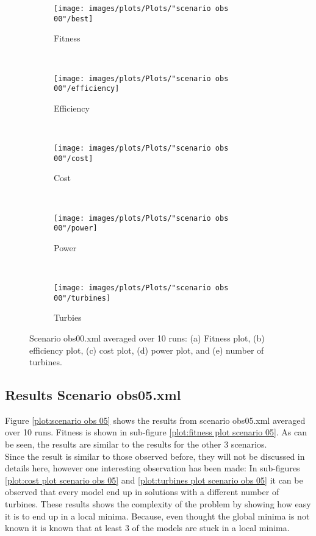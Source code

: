 \begin{figure}[h!]
    \centering
      \begin{subfigure}[b]{0.31\textwidth}
        \texttt{[image: images/plots/Plots/"scenario obs 00"/best]}
        \caption{Fitness}
        \hfill
        \label{plot:fitness plot scenario obs 00}
    \end{subfigure}
    ~
      \begin{subfigure}[b]{0.31\textwidth}
        \texttt{[image: images/plots/Plots/"scenario obs 00"/efficiency]}
        \caption{Efficiency}
        \hfill
        \label{plot:efficiency plot scenario obs 00}
    \end{subfigure}
    ~
    \begin{subfigure}[b]{0.31\textwidth}
        \texttt{[image: images/plots/Plots/"scenario obs 00"/cost]}
        \caption{Cost}
        \hfill
        \label{plot:cost plot scenario obs 00}
    \end{subfigure}
    ~
    \begin{subfigure}[b]{0.31\textwidth}
        \texttt{[image: images/plots/Plots/"scenario obs 00"/power]}
        \caption{Power}
        \hfill
        \label{plot:power plot scenario obs 00}
    \end{subfigure}
    ~
    \begin{subfigure}[b]{0.31\textwidth}
        \texttt{[image: images/plots/Plots/"scenario obs 00"/turbines]}
        \caption{Turbies}
        \hfill
        \label{plot:turbines plot scenario obs 00}
    \end{subfigure}
    \caption{Scenario obs00.xml averaged over 10 runs: (a) Fitness plot, (b) efficiency plot, (c) cost plot, (d) power plot, and (e) number of turbines.}
    \label{plot:scenario obs 00}
\end{figure}


\subsection{Results Scenario obs05.xml}


\noindent Figure \ref{plot:scenario obs 05} shows the results from scenario obs05.xml averaged over 10 runs. Fitness is shown in sub-figure \ref{plot:fitness plot scenario 05}. As can be seen, the results are similar to the results for the other 3 scenarios.\\


\noindent Since the result is similar to those observed before, they will not be discussed in details here, however one interesting observation has been made: In sub-figures \ref{plot:cost plot scenario obs 05} and \ref{plot:turbines plot scenario obs 05} it can be observed that every model end up in solutions with a different number of turbines. These results shows the complexity of the problem by showing how easy it is to end up in a local minima. Because, even thought the global minima is not known it is known that at least 3 of the models are stuck in a local minima.  \\


